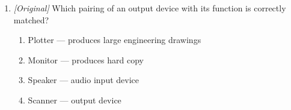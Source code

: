 \documentclass[11pt]{article}
\begin{document}
\begin{enumerate}[label=\textbf{Q\arabic*.}, leftmargin=*]
  it onto the paper by heat is a:
  \begin{enumerate}[label=\Alph*.]
    \item dot-matrix printer.
    \item laser printer.
    \item plotter.
    \item projector.
  \end{enumerate}
\item \textit{[Original]} Which pairing of an output device with its function
  is correctly matched?
  \begin{enumerate}[label=\Alph*.]
    \item Plotter --- produces large engineering drawings
    \item Monitor --- produces hard copy
    \item Speaker --- audio input device
    \item Scanner --- output device
  \end{enumerate}


\end{enumerate}
\end{document}
